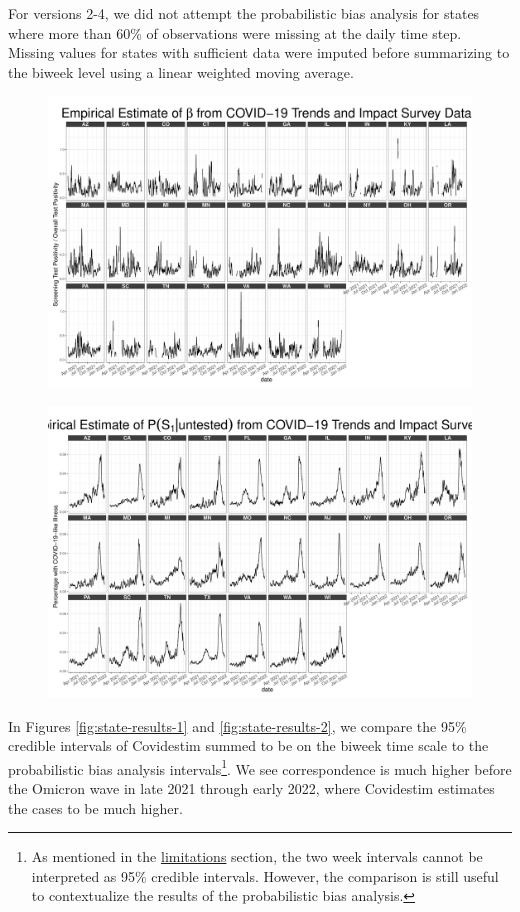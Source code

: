 \documentclass[12pt,twoside]{smiththesis}
\begin{document}
For versions 2-4, we did not attempt the probabilistic bias analysis for states where more than 60\% of observations were missing at the daily time step. Missing values for states with sufficient data were imputed before summarizing to the biweek level using a linear weighted moving average.
\begin{figure}
\includegraphics[width=0.9\linewidth]{figure/ctis_beta_states} \caption{\label{fig:statectis}}\label{fig:unnamed-chunk-76}
\end{figure}
\begin{figure}
\includegraphics[width=0.9\linewidth]{figure/ctis_s_untested_states} \caption{\label{fig:statectis-s-untested}}\label{fig:unnamed-chunk-77}
\end{figure}
In Figures \ref{fig:state-results-1} and \ref{fig:state-results-2}, we compare the 95\% credible intervals of Covidestim summed to be on the biweek time scale to the probabilistic bias analysis intervals\footnote{As mentioned in the \protect\hyperlink{lims}{limitations} section, the two week intervals cannot be interpreted as 95\% credible intervals. However, the comparison is still useful to contextualize the results of the probabilistic bias analysis.}. We see correspondence is much higher before the Omicron wave in late 2021 through early 2022, where Covidestim estimates the cases to be much higher.
\end{document}

